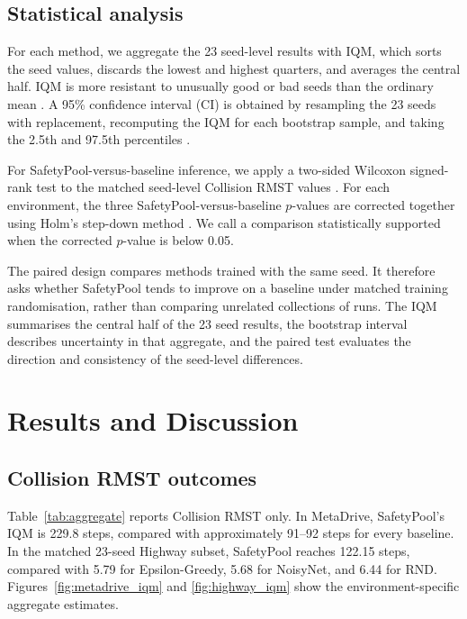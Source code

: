 \documentclass[runningheads]{llncs}
\begin{document}
\subsection{Statistical analysis}

For each method, we aggregate the 23 seed-level results with IQM, which sorts the seed values, discards the lowest and highest quarters, and averages the central half. IQM is more resistant to unusually good or bad seeds than the ordinary mean \cite{agarwal2021precipice}. A 95\% confidence interval (CI) is obtained by resampling the 23 seeds with replacement, recomputing the IQM for each bootstrap sample, and taking the 2.5th and 97.5th percentiles \cite{efron1979bootstrap}.

For SafetyPool-versus-baseline inference, we apply a two-sided Wilcoxon signed-rank test to the matched seed-level Collision RMST values \cite{wilcoxon1945rank}. For each environment, the three SafetyPool-versus-baseline $p$-values are corrected together using Holm's step-down method \cite{holm1979procedure}. We call a comparison statistically supported when the corrected $p$-value is below 0.05.

The paired design compares methods trained with the same seed. It therefore asks whether SafetyPool tends to improve on a baseline under matched training randomisation, rather than comparing unrelated collections of runs. The IQM summarises the central half of the 23 seed results, the bootstrap interval describes uncertainty in that aggregate, and the paired test evaluates the direction and consistency of the seed-level differences.

\section{Results and Discussion}

\subsection{Collision RMST outcomes}

Table~\ref{tab:aggregate} reports Collision RMST only. In MetaDrive, SafetyPool's IQM is 229.8 steps, compared with approximately 91--92 steps for every baseline. In the matched 23-seed Highway subset, SafetyPool reaches 122.15 steps, compared with 5.79 for Epsilon-Greedy, 5.68 for NoisyNet, and 6.44 for RND. Figures~\ref{fig:metadrive_iqm} and \ref{fig:highway_iqm} show the environment-specific aggregate estimates.
\end{document}
